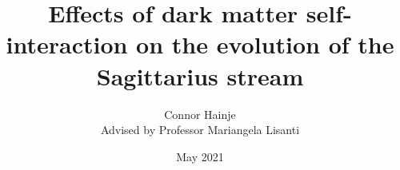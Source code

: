 \documentclass[12pt,oneside]{book}
\title{Effects of dark matter self-interaction on the evolution of the Sagittarius stream}
\author{Connor Hainje\\Advised by Professor Mariangela Lisanti}
\date{May 2021}
\begin{document}
\maketitle


\tableofcontents 

\newpage

\onehalfspacing







% 
% 

\printbibliography
\end{document}
